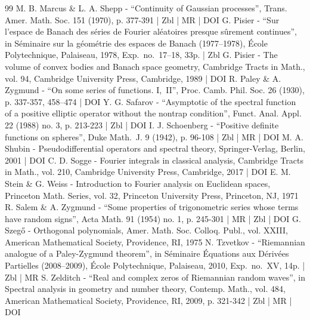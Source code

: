 \begin{thebibliography}{99}
M. B. Marcus \& L. A. Shepp - “Continuity of Gaussian processes”, Trans. Amer. Math. Soc. 151 (1970), p. 377-391 | Zbl | MR | DOI
G. Pisier - “Sur l’espace de Banach des séries de Fourier aléatoires presque sûrement continues”, in Séminaire sur la géométrie des espaces de Banach (1977–1978), École Polytechnique, Palaiseau, 1978, Exp. no. 17–18, 33p. | Zbl
G. Pisier - The volume of convex bodies and Banach space geometry, Cambridge Tracts in Math., vol. 94, Cambridge University Press, Cambridge, 1989 | DOI
R. Paley \& A. Zygmund - “On some series of functions. I, II”, Proc. Camb. Phil. Soc. 26 (1930), p. 337-357, 458–474 | DOI
Y. G. Safarov - “Asymptotic of the spectral function of a positive elliptic operator without the nontrap condition”, Funct. Anal. Appl. 22 (1988) no. 3, p. 213-223 | Zbl | DOI
I. J. Schoenberg - “Positive definite functions on spheres”, Duke Math. J. 9 (1942), p. 96-108 | Zbl | MR | DOI
M. A. Shubin - Pseudodifferential operators and spectral theory, Springer-Verlag, Berlin, 2001 | DOI
C. D. Sogge - Fourier integrals in classical analysis, Cambridge Tracts in Math., vol. 210, Cambridge University Press, Cambridge, 2017 | DOI
E. M. Stein \& G. Weiss - Introduction to Fourier analysis on Euclidean spaces, Princeton Math. Series, vol. 32, Princeton University Press, Princeton, NJ, 1971
R. Salem \& A. Zygmund - “Some properties of trigonometric series whose terms have random signs”, Acta Math. 91 (1954) no. 1, p. 245-301 | MR | Zbl | DOI
G. Szegő - Orthogonal polynomials, Amer. Math. Soc. Colloq. Publ., vol. XXIII, American Mathematical Society, Providence, RI, 1975
N. Tzvetkov - “Riemannian analogue of a Paley-Zygmund theorem”, in Séminaire Équations aux Dérivées Partielles (2008–2009), École Polytechnique, Palaiseau, 2010, Exp. no. XV, 14p. | Zbl | MR
S. Zelditch - “Real and complex zeros of Riemannian random waves”, in Spectral analysis in geometry and number theory, Contemp. Math., vol. 484, American Mathematical Society, Providence, RI, 2009, p. 321-342 | Zbl | MR | DOI
\end{thebibliography}
